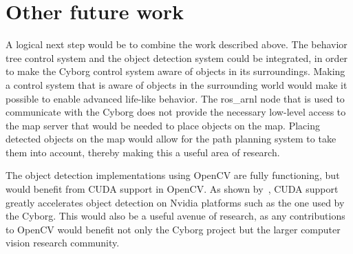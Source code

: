 \documentclass[\rootfolder/main.tex]{subfiles}
\begin{document}
\section{Other future work}

A logical next step would be to combine the work described above.
The behavior tree control system and the object detection system could be integrated, in order to make the Cyborg control system aware of objects in its surroundings.
Making a control system that is aware of objects in the surrounding world would make it possible to enable advanced life-like behavior.
The ros\_arnl node that is used to communicate with the Cyborg does not provide the necessary low-level access to the map server that would be needed to place objects on the map.
Placing detected objects on the map would allow for the path planning system to take them into account, thereby making this a useful area of research.

The object detection implementations using OpenCV are fully functioning, but would benefit from CUDA support in OpenCV.
As shown by~\cite{Opheim2018}, CUDA support greatly accelerates object detection on Nvidia platforms such as the one used by the Cyborg.
This would also be a useful avenue of research, as any contributions to OpenCV would benefit not only the Cyborg project but the larger computer vision research community.
\end{document}
